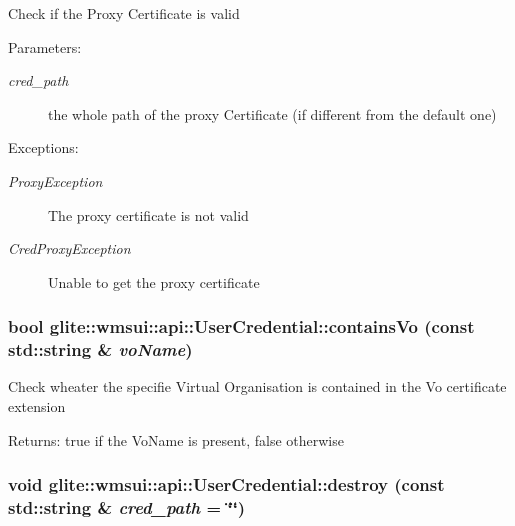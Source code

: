 Check if the Proxy Certificate is valid \begin{Desc}
\item[Parameters:]
\begin{description}
\item[{\em cred\_\-path}]the whole path of the proxy Certificate (if different from the default one) \end{description}
\end{Desc}
\begin{Desc}
\item[Exceptions:]
\begin{description}
\item[{\em Proxy\-Exception}]The proxy certificate is not valid \item[{\em Cred\-Proxy\-Exception}]Unable to get the proxy certificate\end{description}
\end{Desc}
\hypertarget{classglite_1_1wmsui_1_1api_1_1UserCredential_a13}{
\subsubsection[containsVo]{\setlength{\rightskip}{0pt plus 5cm}bool glite::wmsui::api::User\-Credential::contains\-Vo (const std::string \& {\em vo\-Name})}}
\label{classglite_1_1wmsui_1_1api_1_1UserCredential_a13}


Check wheater the specifie Virtual Organisation is contained in the Vo certificate extension \begin{Desc}
\item[Returns:]true if the Vo\-Name is present, false otherwise\end{Desc}
\hypertarget{classglite_1_1wmsui_1_1api_1_1UserCredential_a8}{
\subsubsection[destroy]{\setlength{\rightskip}{0pt plus 5cm}void glite::wmsui::api::User\-Credential::destroy (const std::string \& {\em cred\_\-path} = \char`\"{}\char`\"{})}}
\label{classglite_1_1wmsui_1_1api_1_1UserCredential_a8}


